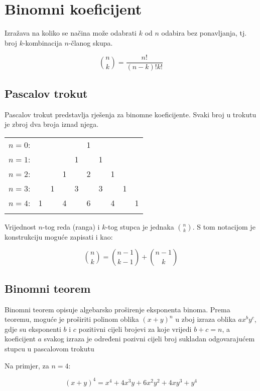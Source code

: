 \section{Binomni koeficijent}

Izražava na koliko se načina može odabrati $k$ od $n$ odabira bez ponavljanja,
tj. broj $k$-kombinacija $n$-članog skupa.

$$
\binom{n}{k} = \frac{n!}{(n-k)!k!}
$$

\subsection{Pascalov trokut}

Pascalov trokut predstavlja rješenja za binomne koeficijente. Svaki broj u
trokutu je zbroj dva broja iznad njega.

\begin{tabular}{rccccccccc}
    $n=0$:&    &    &    &    &  1\\\noalign{\smallskip\smallskip}
    $n=1$:&    &    &    &  1 &    &  1\\\noalign{\smallskip\smallskip}
    $n=2$:&    &    &  1 &    &  2 &    &  1\\\noalign{\smallskip\smallskip}
    $n=3$:&    &  1 &    &  3 &    &  3 &    &  1\\\noalign{\smallskip\smallskip}
    $n=4$:&  1 &    &  4 &    &  6 &    &  4 &    &  1\\\noalign{\smallskip\smallskip}
\end{tabular}

Vrijednost $n$-tog reda (ranga) i $k$-tog stupca je jednaka $\binom{n}{k}$. S
tom notacijom je konstrukciju moguće zapisati i kao:

$$
\binom{n}{k} = \binom{n-1}{k-1} + \binom{n-1}{k}
$$

\subsection{Binomni teorem}

Binomni teorem opisuje algebarsko proširenje eksponenta binoma. Prema teoremu,
moguće je proširiti polinom oblika $(x+y)^n$ u zboj izraza oblika $ax^by^c$,
gdje su eksponenti $b$ i $c$ pozitivni cijeli brojevi za koje vrijedi $b+c=n$, a
koeficijent $a$ svakog izraza je određeni pozivni cijeli broj sukladan
odgovarajućem stupcu u pascalovom trokutu

Na primjer, za $n=4$:

$$
(x+y)^4=x^4+4x^3y+6x^2y^2+4xy^3+y^4
$$

